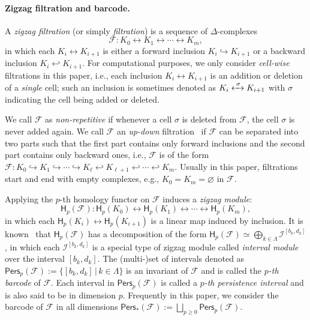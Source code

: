 \documentclass[letterpaper,11pt]{article}
\theoremstyle{mythmstyle}
\theoremstyle{mydefstyle}
\theoremstyle{plain}
\theoremstyle{definition}
\newcommand{\Hm}{\mathsf{H}}
\newcommand{\Pers}{\mathsf{Pers}}
\newcommand{\<}[1]{\langle #1\rangle}
\newcommand{\lbarrowspace}{\;}
\newcommand{\lrarrowsp}[1]{\xleftrightarrow{\lbarrowspace#1\lbarrowspace}}
\let\leftrightarrowsp\lrarrowsp
\newcommand{\incto}{\hookrightarrow}
\newcommand{\bakincto}{\hookleftarrow}
\newcommand{\given}{\,|\,}
\newcommand{\Set}[1]{\{#1\}}
\let\emptyset\varnothing
\newcommand{\Fcal}{\mathcal{F}}
\newcommand{\Ical}{\mathcal{I}}
\newcommand{\DG}{\Delta}
\newcommand{\LG}{\Lambda}
\newcommand{\sG}{\sigma}
\newcommand{\Dim}{p}
\newcommand{\birth}{b}
\newcommand{\death}{d}
\newcommand{\filtcnt}{m}
\begin{document}
\paragraph{Zigzag filtration and barcode.}

A {\it zigzag filtration} (or simply {\it filtration})
is a sequence of $\DG$-complexes 
\[\Fcal: K_0 \leftrightarrow K_1 \leftrightarrow 
\cdots \leftrightarrow K_\filtcnt,\]
in which each
$K_i\leftrightarrow K_{i+1}$ is either a forward inclusion $K_i\incto K_{i+1}$
or a backward inclusion $K_i\bakincto K_{i+1}$.
For computational purposes, 
we only consider \emph{cell-wise} filtrations in this paper, i.e.,
each inclusion $K_i\leftrightarrow K_{i+1}$ is an addition or deletion
of a \emph{single} cell;
such an inclusion is sometimes denoted as $K_i\leftrightarrowsp{\sG} K_{i+1}$
with $\sG$ indicating the cell being added or deleted.

We call $\Fcal$ as \emph{non-repetitive} if 
whenever a cell $\sG$ is deleted from $\Fcal$,
the cell $\sG$ is never added again.
We call
$\Fcal$ an {\it up-down} filtration~\cite{carlsson2009zigzag-realvalue} if 
$\Fcal$ can be separated into two parts such that
the first part contains only forward inclusions
and the second part contains only backward ones,
i.e., $\Fcal$ is of the form $\Fcal: K_0 \incto K_1 \incto 
\cdots \incto K_{\ell} \bakincto K_{\ell+1} \bakincto \cdots \bakincto K_\filtcnt$.
Usually in this paper, filtrations start and end with empty complexes,
e.g., $K_0=K_\filtcnt=\emptyset$ in $\Fcal$.

Applying the $\Dim$-th homology functor on $\Fcal$
induces a {\it zigzag module}:
\[\Hm_\Dim(\Fcal): 
\Hm_\Dim(K_0) 
\leftrightarrow
\Hm_\Dim(K_1) 
\leftrightarrow
\cdots 
\leftrightarrow
\Hm_\Dim(K_\filtcnt), \]
in which
each $\Hm_\Dim(K_i)\leftrightarrow \Hm_\Dim(K_{i+1})$
is a linear map induced by inclusion.
It is known~\cite{carlsson2010zigzag,Gabriel72} that
$\Hm_\Dim(\Fcal)$ has a decomposition of the form
$\Hm_\Dim(\Fcal)\simeq\bigoplus_{k\in\LG}\Ical^{[\birth_k,\death_k]}$,
in which each $\Ical^{[\birth_k,\death_k]}$
is a special type of zigzag module called {\it interval module} over the interval $[\birth_k,\death_k]$.
The (multi-)set of intervals
denoted as
$\Pers_\Dim(\Fcal):=\Set{[\birth_k,\death_k]\given k\in\LG}$
is an invariant of $\Fcal$
and is called the {\it $\Dim$-th barcode} of $\Fcal$.
Each interval in $\Pers_\Dim(\Fcal)$ is called a {\it $\Dim$-th persistence interval}
and is also said to be in dimension $\Dim$.
Frequently in this paper, we consider the barcode of $\Fcal$ in all dimensions
$\Pers_*(\Fcal):=\bigsqcup_{\Dim\geq 0}\Pers_\Dim(\Fcal)$.
\end{document}
